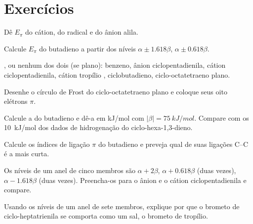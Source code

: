 \section{Exercícios}

\begin{exercise}[$\star$]\label{exo:b2:huckel:1}
Dê $E_\pi$ do cátion, do radical e do ânion alila.
\end{exercise}

\begin{exercise}[$\star$]\label{exo:b2:huckel:2}
Calcule $E_\pi$ do butadieno a partir dos níveis $\alpha \pm 1.618\beta$, $\alpha \pm 0.618\beta$.
\end{exercise}

\begin{exercise}[$\star$]\label{exo:b2:huckel:3}
,  ou nenhum dos dois (se plano): benzeno, ânion
ciclopentadienila, cátion ciclopentadienila, cátion tropílio ,
ciclobutadieno, ciclo-octatetraeno plano.
\end{exercise}

\begin{exercise}[$\star$]\label{exo:b2:huckel:4}
Desenhe o círculo de Frost do ciclo-octatetraeno plano e coloque seus oito elétrons $\pi$.
\end{exercise}

\begin{exercise}[$\star\star$]\label{exo:b2:huckel:5}
Calcule a  do butadieno e dê-a em \unit{kJ/mol} com
$|\beta| = \qty{75}{kJ/mol}$. Compare com os \qty{10}{kJ/mol} dos dados de
hidrogenação do ciclo-hexa-1,3-dieno.
\end{exercise}

\begin{exercise}[$\star\star$]\label{exo:b2:huckel:6}
Calcule os índices de ligação $\pi$ do butadieno e preveja qual de suas
ligações C--C é a mais curta.
\end{exercise}

\begin{exercise}[$\star\star$]\label{exo:b2:huckel:7}
Os níveis de um anel de cinco membros são $\alpha + 2\beta$, $\alpha + 0.618\beta$ (duas vezes),
$\alpha - 1.618\beta$ (duas vezes). Preencha-os para o ânion e o cátion
ciclopentadienila e compare.
\end{exercise}

\begin{exercise}[$\star\star$]\label{exo:b2:huckel:8}
Usando os níveis de um anel de sete membros, explique por que o brometo de
ciclo-heptatrienila se comporta como um sal, o brometo de tropílio.
\end{exercise}

